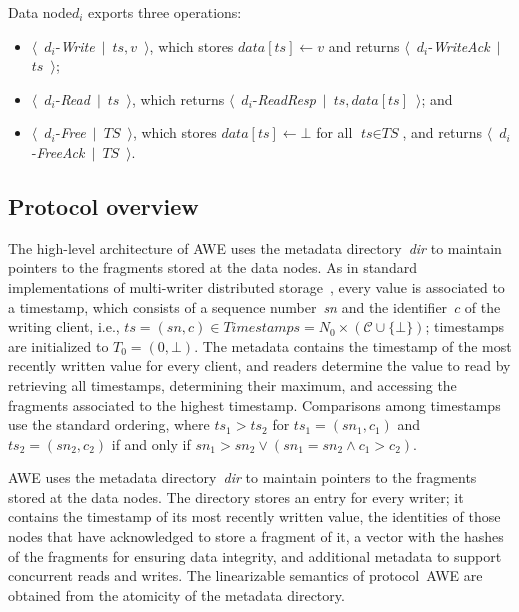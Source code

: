 \documentclass[oribibl]{llncs}
\theoremstyle{definition-boldhead}
\newcommand{\var}[1]{\textit{#1}}
\newcommand{\eventt}[3]{$\langle$~{\var{#1}}-\textsl{#2}~$\mid$~{#3}~$\rangle$}
\newcommand{\becomes}{\ensuremath{\leftarrow}}
\newcommand{\clientset}{\ensuremath{\mathcal{C}}\xspace}
\newcommand{\dir}{\var{dir}\xspace}
\newcommand{\NAME}{AWE\xspace}
\newcommand{\node}{node\xspace}
\newcommand{\nodes}{nodes\xspace}
\begin{document}
Data \node $d_i$ exports three operations:
\begin{itemize}
\item \eventt{$d_i$}{Write}{$\var{ts}, v$}, which stores $\var{data}[\var{ts}] \becomes v$ and returns \eventt{$d_i$}{WriteAck}{$\var{ts}$};
\item  \eventt{$d_i$}{Read}{$\var{ts}$}, which returns  \eventt{$d_i$}{ReadResp}{$\var{ts}, \var{data}[\var{ts}]$}; and
\item  \eventt{$d_i$}{Free}{$\var{TS}$}, which stores $\var{data}[\var{ts}] \becomes \bot$ for all $\var{ts} \in \var{TS}$, and returns \eventt{$d_i$}{FreeAck}{$\var{TS}$}.
\end{itemize}

\fi

\subsection{Protocol overview}

\if\submit\no
The high-level architecture of \NAME uses the metadata directory~\dir
to maintain pointers to the fragments stored at the data \nodes.
As in standard implementations of multi-writer distributed
storage~\cite{CachinGR11}, every value is associated to a timestamp,
which consists of a sequence number~\var{sn} and the identifier~$c$ of
the writing client, i.e., $\var{ts} = (\var{sn}, c) \in
\var{Timestamps} = N_0 \times (\clientset \cup \{\bot\})$; timestamps
are initialized to $T_0 = (0, \bot)$.  The metadata contains the
timestamp of the most recently written value for every client, and
readers determine the value to read by retrieving all timestamps,
determining their maximum, and accessing the fragments associated to
the highest timestamp.  Comparisons among timestamps use the standard
ordering, where $\var{ts}_1 > \var{ts}_2$ for $\var{ts}_1 =
(\var{sn}_1, c_1)$ and $\var{ts}_2 = (\var{sn}_2, c_2)$ if and only if
$\var{sn}_1 > \var{sn}_2 \lor (\var{sn}_1 = \var{sn}_2 \land c_1 >
c_2)$.
\fi

\if\submit\yes
\NAME uses the metadata directory~\dir
to maintain pointers to the fragments stored at the data \nodes.
\fi
The directory stores an entry for every writer; it contains the
timestamp of its most recently written value, the identities of those
\nodes that have acknowledged to store a fragment of it, a vector
with the hashes of the fragments for ensuring data integrity, and
additional metadata to support concurrent reads and writes.  The linearizable
semantics of protocol~\NAME are obtained from the atomicity of the
metadata directory.
\end{document}
